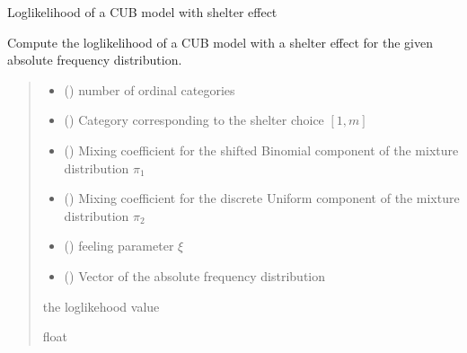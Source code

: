 \documentclass[letterpaper,10pt,english]{sphinxmanual}
\begin{document}
\begin{fulllineitems}
\label{\detokenize{cubmods:cubmods.cubsh.loglik}}
\pysigstartsignatures
{}
\pysigstopsignatures
\sphinxAtStartPar
Log\sphinxhyphen{}likelihood of a CUB model with shelter effect

\sphinxAtStartPar
Compute the log\sphinxhyphen{}likelihood of a CUB model with a shelter effect
for the given absolute frequency distribution.
\begin{quote}\begin{description}
\begin{itemize}
\item {} 
\sphinxAtStartPar
{} () \textendash{} number of ordinal categories

\item {} 
\sphinxAtStartPar
{} () \textendash{} Category corresponding to the shelter choice \([1,m]\)

\item {} 
\sphinxAtStartPar
{} () \textendash{} Mixing coefficient for the shifted Binomial component of the mixture distribution \(\pi_1\)

\item {} 
\sphinxAtStartPar
{} () \textendash{} Mixing coefficient for the discrete Uniform component of the mixture distribution \(\pi_2\)

\item {} 
\sphinxAtStartPar
{} () \textendash{} feeling parameter \(\xi\)

\item {} 
\sphinxAtStartPar
{} () \textendash{} Vector of the absolute frequency distribution

\end{itemize}

\sphinxAtStartPar
the log\sphinxhyphen{}likehood value

\sphinxAtStartPar
float

\end{description}\end{quote}

\end{fulllineitems}
\end{document}
